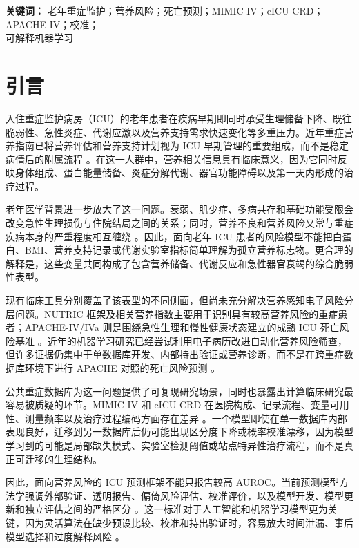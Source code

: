 \documentclass[11pt]{ctexart}
\begin{document}
\noindent\textbf{关键词：} 老年重症监护；营养风险；死亡预测；MIMIC-IV；eICU-CRD；APACHE-IV；校准；\\
可解释机器学习

\section{引言}
入住重症监护病房（ICU）的老年患者在疾病早期即同时承受生理储备下降、既往脆弱性、急性炎症、代谢应激以及营养支持需求快速变化等多重压力。近年重症营养指南已将营养评估和营养支持计划视为 ICU 早期管理的重要组成，而不是稳定病情后的附属流程 \citep{Singer2023ESPENPractical,Compher2022ASPEN,deMan2024ICUNutrition}。在这一人群中，营养相关信息具有临床意义，因为它同时反映身体组成、蛋白能量储备、炎症分解代谢、器官功能障碍以及第一天内形成的治疗过程。

老年医学背景进一步放大了这一问题。衰弱、肌少症、多病共存和基础功能受限会改变急性生理损伤与住院结局之间的关系；同时，营养不良和营养风险又常与重症疾病本身的严重程度相互缠绕 \citep{Compher2025GLIMCriticalIllness,Moisi2024Frailty,Inaba2023Frailty}。因此，面向老年 ICU 患者的风险模型不能把白蛋白、BMI、营养支持记录或代谢实验室指标简单理解为孤立营养标志物。更合理的解释是，这些变量共同构成了包含营养储备、代谢反应和急性器官衰竭的综合脆弱性表型。

现有临床工具分别覆盖了该表型的不同侧面，但尚未充分解决营养感知电子风险分层问题。NUTRIC 框架及相关营养指数主要用于识别具有较高营养风险的重症患者；APACHE-IV/IVa 则是围绕急性生理和慢性健康状态建立的成熟 ICU 死亡风险基准 \citep{Heyland2011NUTRIC,Peng2023GNRI,Zimmerman2006ApacheIV}。近年的机器学习研究已经尝试利用电子病历改进自动化营养风险筛查，但许多证据仍集中于单数据库开发、内部持出验证或营养诊断，而不是在跨重症数据库环境下进行 APACHE 对照的死亡风险预测 \citep{Zhang2026ENUTRIC,Cao2026NIM}。

公共重症数据库为这一问题提供了可复现研究场景，同时也暴露出计算临床研究最容易被质疑的环节。MIMIC-IV 和 eICU-CRD 在医院构成、记录流程、变量可用性、测量频率以及治疗过程编码方面存在差异 \citep{Johnson2023MIMICIV,Pollard2018EICU}。一个模型即使在单一数据库内部表现良好，迁移到另一数据库后仍可能出现区分度下降或概率校准漂移，因为模型学习到的可能是局部缺失模式、实验室检测阈值或站点特异性治疗流程，而不是真正可迁移的生理结构。

因此，面向营养风险的 ICU 预测框架不能只报告较高 AUROC。当前预测模型方法学强调外部验证、透明报告、偏倚风险评估、校准评价，以及模型开发、模型更新和独立评估之间的严格区分 \citep{Collins2024EvalPart1,Riley2024EvalPart2,Collins2024TRIPODAI}。这一标准对于人工智能和机器学习模型更为关键，因为灵活算法在缺少预设比较、校准和持出验证时，容易放大时间泄漏、事后模型选择和过度解释风险 \citep{Moons2025PROBASTAI,VanCalster2023NoValidated,VanCalster2019Calibration}。
\end{document}
